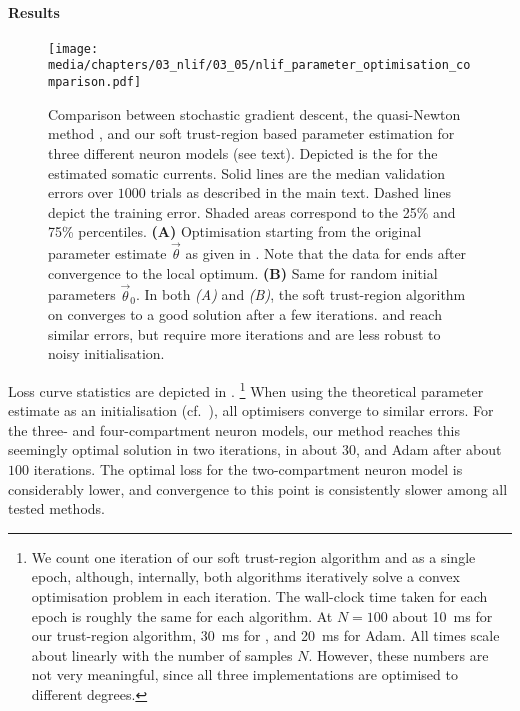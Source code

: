 \paragraph{Results}

\begin{figure}
	\texttt{[image: media/chapters/03\_nlif/03\_05/nlif\_parameter\_optimisation\_comparison.pdf]}%
	{\label{fig:nlif_parameter_optimisation_comparison_a}}%
	{\label{fig:nlif_parameter_optimisation_comparison_b}}%
	\caption[Comparing different optimisers performing parameter optimisation]{Comparison between stochastic gradient descent, the quasi-Newton method \LBFGSB, and our soft trust-region based parameter estimation for three different neuron models (see text).
	Depicted is the \NRMSE for the estimated somatic currents.
	Solid lines are the median validation errors over $1000$ trials as described in the main text.
	Dashed lines depict the training error.
	Shaded areas correspond to the 25\% and 75\% percentiles.
	\textbf{(A)} Optimisation starting from the original parameter estimate $\vec \theta$ as given in .
	Note that the data for \LBFGSB ends after convergence to the local optimum.
	\textbf{(B)} Same for random initial parameters $\vec \theta_0$.
	In both \emph{(A)} and \emph{(B)}, the soft trust-region algorithm on converges to a good solution after a few iterations.
	\SGD and \LBFGSB reach similar errors, but require more iterations and are less robust to noisy initialisation.
	}
	\label{fig:nlif_parameter_optimisation_comparison}
\end{figure}

Loss curve statistics are depicted in .%
\footnote{
We count one iteration of our soft trust-region algorithm and \LBFGSB as a single epoch, although, internally, both algorithms iteratively solve a convex optimisation problem in each iteration.
The wall-clock time taken for each epoch is roughly the same for each algorithm.
At $N = 100$ about \SI{10}{\milli\second} for our trust-region algorithm, \SI{30}{\milli\second} for \LBFGSB, and \SI{20}{\milli\second} for Adam.
All times scale about linearly with the number of samples $N$.
However, these numbers are not very meaningful, since all three implementations are optimised to different degrees.
}
When using the theoretical parameter estimate as an initialisation (cf.~), all optimisers converge to similar errors.
For the three- and four-compartment neuron models, our method reaches this seemingly optimal solution in two iterations, \LBFGSB in about $30$, and Adam after about $100$ iterations.
The optimal loss for the two-compartment neuron model is considerably lower, and convergence to this point is consistently slower among all tested methods.

